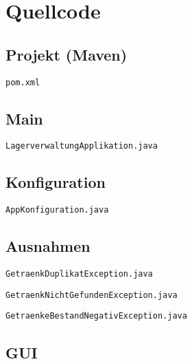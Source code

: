 \chapter{Quellcode}

\section{Projekt (Maven)}

\verb|pom.xml|



\section{Main}

\verb|LagerverwaltungApplikation.java|



\section{Konfiguration}

\verb|AppKonfiguration.java|



\section{Ausnahmen}

\verb|GetraenkDuplikatException.java|



\verb|GetraenkNichtGefundenException.java|



\verb|GetraenkeBestandNegativException.java|



\section{GUI}

